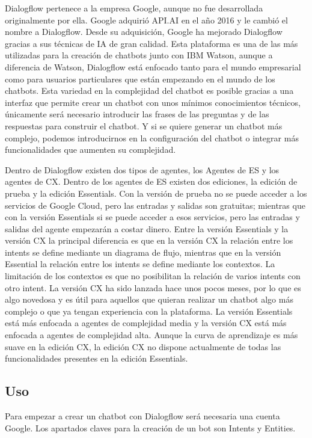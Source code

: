 Dialogflow pertenece a la empresa Google, aunque no fue desarrollada originalmente por ella. Google adquirió API.AI en el año 2016 y le cambió el nombre a Dialogflow. Desde su adquisición, Google ha mejorado Dialogflow gracias a sus técnicas de \gls{IA} de gran calidad. Esta plataforma es una de las más utilizadas para la creación de chatbots junto con IBM Watson, aunque a diferencia de Watson, Dialogflow está enfocado tanto para el mundo empresarial como para usuarios particulares que están empezando en el mundo de los chatbots. Esta variedad en la complejidad del chatbot es posible gracias a una interfaz que permite crear un chatbot con unos mínimos conocimientos técnicos, únicamente será necesario introducir las frases de las preguntas y de las respuestas para construir el chatbot. Y si se quiere generar un chatbot más complejo, podemos introducirnos en la configuración del chatbot o integrar más funcionalidades que aumenten su complejidad.

Dentro de Dialogflow existen dos tipos de agentes, los Agentes de ES y los agentes de CX. Dentro de los agentes de ES existen dos ediciones, la edición de prueba y la edición Essentials. Con la versión de prueba no se puede acceder a los servicios de Google Cloud, pero las entradas y salidas son gratuitas; mientras que con la versión Essentials si se puede acceder a esos servicios, pero las entradas y salidas del agente empezarán a costar dinero. Entre la versión Essentials y la versión CX la principal diferencia es que en la versión CX la relación entre los intents se define mediante un diagrama de flujo, mientras que en la versión Essential la relación entre los intents se define mediante los contextos. La limitación de los contextos es que no posibilitan la relación de varios intents con otro intent. La versión CX ha sido lanzada hace unos pocos meses, por lo que es algo novedosa y es útil para aquellos que quieran realizar un chatbot algo más complejo o que ya tengan experiencia con la plataforma. La versión Essentials está más enfocada a agentes de complejidad media y la versión CX está más enfocada a agentes de complejidad alta. Aunque la curva de aprendizaje es más suave en la edición CX, la edición CX no dispone actualmente de todas las funcionalidades presentes en la edición Essentials.

\subsection*{Uso}

Para empezar a crear un chatbot con Dialogflow será necesaria una cuenta Google. Los apartados claves para la creación de un bot son Intents y Entities.

